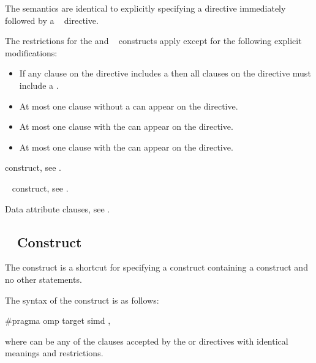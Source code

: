 \descr
The semantics are identical to explicitly specifying a  directive 
immediately followed by a ~ directive.

\restrictions
The restrictions for the  and ~ constructs 
apply except for the following explicit modifications:

\begin{itemize}
\item If any  clause on the directive includes a
       then all  clauses
      on the directive must include a .
\item At most one  clause without a
       can appear on the directive.
\item At most one  clause with the 
       can appear on the directive.
\item At most one  clause with the 
       can appear on the directive.
\end{itemize}

\begin{crossrefs}
\item {} construct, see .

\item {}~ construct, see
.

\item Data attribute clauses, see .
\end{crossrefs}



\subsection{~ Construct}
\label{subsec:target simd Construct}

\summary
The   construct is a shortcut for specifying a 
construct containing a  construct and no other statements.

\syntax
\begin{ccppspecific}
The syntax of the   construct is as follows:

\begin{ompcPragma}
#pragma omp target simd \plc{[clause[ [},\plc{] clause] ... ] new-line}
\end{ompcPragma}

where  can be any of the clauses accepted by the  or
 directives with identical meanings and restrictions.

\end{ccppspecific}

